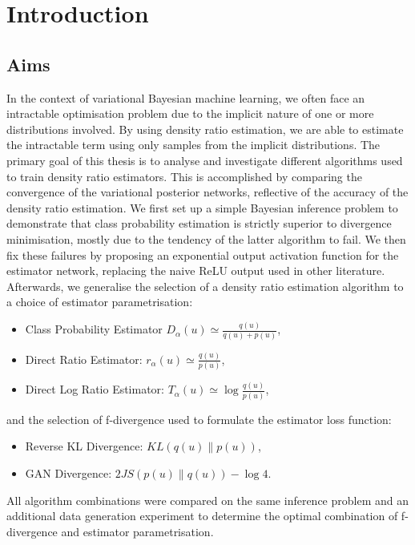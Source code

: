 \documentclass[honours,12pt]{unswthesis}
\newcommand\blankpage{%
    \null
    \thispagestyle{empty}%
    \addtocounter{page}{-1}%
    \newpage}
\numberwithin{equation}{section}
\theoremstyle{definition}
\begin{document}
\afterpreface

%
%

\afterpage{\blankpage}

\chapter{Introduction}\label{s-intro}
\section{Aims}
In the context of variational Bayesian machine learning, we often face an intractable optimisation problem due to the implicit nature of one or more distributions involved. By using density ratio estimation, we are able to estimate the intractable term using only samples from the implicit distributions. The primary goal of this thesis is to analyse and investigate different algorithms used to train density ratio estimators. This is accomplished by comparing the convergence of the variational posterior networks, reflective of the accuracy of the density ratio estimation. We first set up a simple Bayesian inference problem to demonstrate that class probability estimation is strictly superior to divergence minimisation, mostly due to the tendency of the latter algorithm to fail. We then fix these failures by proposing an exponential output activation function for the estimator network, replacing the naive ReLU output used in other literature. Afterwards, we generalise the selection of a density ratio estimation algorithm to a choice of estimator parametrisation:
\begin{itemize}
\item Class Probability Estimator $D_\alpha(u)\simeq \frac{q(u)}{q(u)+p(u)}$,
\item Direct Ratio Estimator: $r_\alpha(u)\simeq \frac{q(u)}{p(u)}$,
\item Direct Log Ratio Estimator: $T_\alpha(u)\simeq \log \frac{q(u)}{p(u)}$,
\end{itemize} 
and the selection of f-divergence used to formulate the estimator loss function:
\begin{itemize}
\item Reverse KL Divergence: $KL(q(u)\|p(u))$,
\item GAN Divergence: $2JS(p(u)\|q(u))-\log 4$.
\end{itemize}
All algorithm combinations were compared on the same inference problem and an additional data generation experiment to determine the optimal combination of f-divergence and estimator parametrisation.
\end{document}
